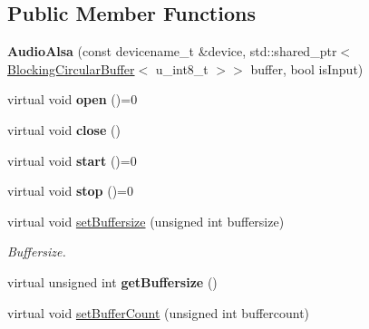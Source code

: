 \subsection*{Public Member Functions}
\begin{DoxyCompactItemize}
\item 
\hypertarget{classNl_1_1AudioAlsa_a486f9b8b26b8c7eadcc0dec460c1a14a}{}{\bfseries Audio\+Alsa} (const devicename\+\_\+t \&device, std\+::shared\+\_\+ptr$<$ \hyperlink{classNl_1_1BlockingCircularBuffer}{Blocking\+Circular\+Buffer}$<$ u\+\_\+int8\+\_\+t $>$$>$ buffer, bool is\+Input)\label{classNl_1_1AudioAlsa_a486f9b8b26b8c7eadcc0dec460c1a14a}

\item 
\hypertarget{classNl_1_1AudioAlsa_adada0a143dbd23462e3513a467520b8e}{}virtual void {\bfseries open} ()=0\label{classNl_1_1AudioAlsa_adada0a143dbd23462e3513a467520b8e}

\item 
\hypertarget{classNl_1_1AudioAlsa_a99c454b8bb141a18f0ec39955550ca1e}{}virtual void {\bfseries close} ()\label{classNl_1_1AudioAlsa_a99c454b8bb141a18f0ec39955550ca1e}

\item 
\hypertarget{classNl_1_1AudioAlsa_a0c5d5f446b903fb48936c2ebb06b42b9}{}virtual void {\bfseries start} ()=0\label{classNl_1_1AudioAlsa_a0c5d5f446b903fb48936c2ebb06b42b9}

\item 
\hypertarget{classNl_1_1AudioAlsa_a0c02717d31e7e1226dc619b149b631d0}{}virtual void {\bfseries stop} ()=0\label{classNl_1_1AudioAlsa_a0c02717d31e7e1226dc619b149b631d0}

\item 
\hypertarget{classNl_1_1AudioAlsa_aedd7eae90e53aa2fcd3dede15276a7b6}{}virtual void \hyperlink{classNl_1_1AudioAlsa_aedd7eae90e53aa2fcd3dede15276a7b6}{set\+Buffersize} (unsigned int buffersize)\label{classNl_1_1AudioAlsa_aedd7eae90e53aa2fcd3dede15276a7b6}

\begin{DoxyCompactList}\small\item\em Buffersize. \end{DoxyCompactList}\item 
\hypertarget{classNl_1_1AudioAlsa_a61e54f409c8281b3a6dc3feabbe47514}{}virtual unsigned int {\bfseries get\+Buffersize} ()\label{classNl_1_1AudioAlsa_a61e54f409c8281b3a6dc3feabbe47514}

\item 
\hypertarget{classNl_1_1AudioAlsa_a17d24c379eb471145be2e88626e9da6b}{}virtual void \hyperlink{classNl_1_1AudioAlsa_a17d24c379eb471145be2e88626e9da6b}{set\+Buffer\+Count} (unsigned int buffercount)\label{classNl_1_1AudioAlsa_a17d24c379eb471145be2e88626e9da6b}


\end{DoxyCompactItemize}
